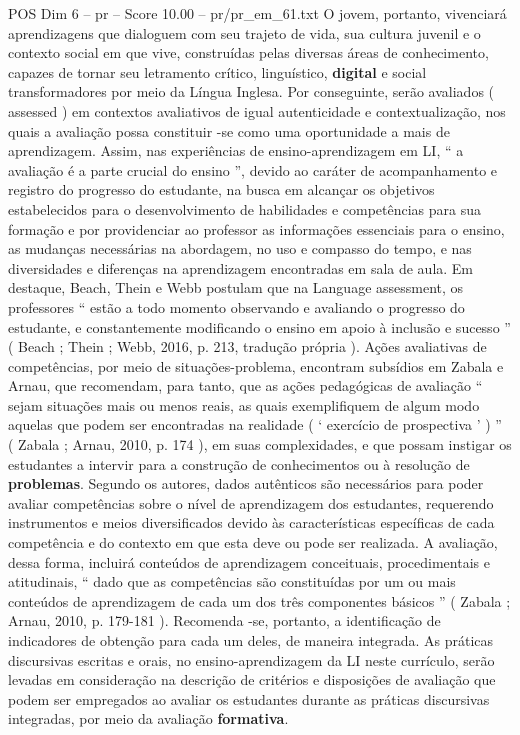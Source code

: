 \begin{textsample}{POS Dim 6 – pr – Score 10.00 – pr/pr\_em\_61.txt}
O jovem, portanto, vivenciará aprendizagens que dialoguem com seu trajeto de vida, sua cultura juvenil e o contexto social em que vive, construídas pelas diversas áreas de conhecimento, capazes de tornar seu letramento crítico, linguístico, \textbf{digital} e social transformadores por meio da Língua Inglesa.
Por conseguinte, serão avaliados ( assessed ) em contextos avaliativos de igual autenticidade e contextualização, nos quais a avaliação possa constituir -se como uma oportunidade a mais de aprendizagem.
Assim, nas experiências de ensino-aprendizagem em LI, “ a avaliação é a parte crucial do ensino ”, devido ao caráter de acompanhamento e registro do progresso do estudante, na busca em alcançar os objetivos estabelecidos para o desenvolvimento de habilidades e competências para sua formação e por providenciar ao professor as informações essenciais para o ensino, as mudanças necessárias na abordagem, no uso e compasso do tempo, e nas diversidades e diferenças na aprendizagem encontradas em sala de aula.
Em destaque, Beach, Thein e Webb postulam que na Language assessment, os professores “ estão a todo momento observando e avaliando o progresso do estudante, e constantemente modificando o ensino em apoio à inclusão e sucesso ” ( Beach ; Thein ; Webb, 2016, p. 213, tradução própria ).
Ações avaliativas de competências, por meio de situações-problema, encontram subsídios em Zabala e Arnau, que recomendam, para tanto, que as ações pedagógicas de avaliação “ sejam situações mais ou menos reais, as quais exemplifiquem de algum modo aquelas que podem ser encontradas na realidade ( ‘ exercício de prospectiva ’ ) ” ( Zabala ; Arnau, 2010, p. 174 ), em suas complexidades, e que possam instigar os estudantes a intervir para a construção de conhecimentos ou à resolução de \textbf{problemas}.
Segundo os autores, dados autênticos são necessários para poder avaliar competências sobre o nível de aprendizagem dos estudantes, requerendo instrumentos e meios diversificados devido às características específicas de cada competência e do contexto em que esta deve ou pode ser realizada.
A avaliação, dessa forma, incluirá conteúdos de aprendizagem conceituais, procedimentais e atitudinais, “ dado que as competências são constituídas por um ou mais conteúdos de aprendizagem de cada um dos três componentes básicos ” ( Zabala ; Arnau, 2010, p. 179-181 ).
Recomenda -se, portanto, a identificação de indicadores de obtenção para cada um deles, de maneira integrada.
As práticas discursivas escritas e orais, no ensino-aprendizagem da LI neste currículo, serão levadas em consideração na descrição de critérios e disposições de avaliação que podem ser empregados ao avaliar os estudantes durante as práticas discursivas integradas, por meio da avaliação \textbf{formativa}.

\end{textsample}
